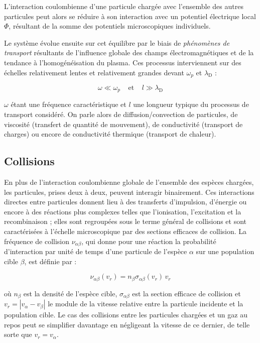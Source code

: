 \begin{refsection}
L'interaction coulombienne d'une particule chargée avec l'ensemble des autres particules peut alors
se réduire à son interaction avec un potentiel électrique local $\Phi$,
résultant de la somme des potentiels microscopiques individuels.

Le système évolue ensuite sur cet équilibre par le biais de
\emph{phénomènes de transport} résultants de l'influence
globale des champs électromagnétiques et de la tendance à
l'homogénéisation du plasma.
Ces processus interviennent sur des échelles relativement
lentes et relativement grandes devant $\omega_{p}$ et $\lambda_\text{D}$ :

\begin{equation}
\omega\ll \omega_{p}
\;\;\;\;\text{et}\;\;\;\;l\gg\lambda_\text{D}
\end{equation}

$\omega$ étant une fréquence caractéristique et $l$ une longueur typique
du processus de transport considéré.
On parle alors de diffusion/convection de particules, de viscosité (transfert de
quantité de mouvement), de conductivité (transport de charges) ou encore de
conductivité thermique (transport de chaleur).

\subsection{Collisions}
\label{1-Collisions}
En plus de l'interaction coulombienne globale de l'ensemble des espèces chargées, 
les particules, prises deux à deux, peuvent interagir binairement. 
Ces interactions directes entre particules donnent lieu à des transferts
d'impulsion, d'énergie ou encore à des réactions plus complexes telles que
l'ionisation, l'excitation et la recombinaison ; elles sont regroupées
sous le terme général de collisions et sont caractérisées à l'échelle
microscopique par des sections efficaces de collision. La fréquence de
collision $\nu_{\alpha \beta}$, qui donne pour une réaction la probabilité
d'interaction par unité de temps d'une particule de l'espèce $\alpha$ sur une
population cible $\beta$, est définie par :

\begin{equation}
\label{1-collisionfreq}
	\nu_{\alpha
	\beta}(v_r)=n_\beta\sigma_{\alpha
	\beta}(v_r)\,v_r
\end{equation}

où $n_\beta$ est la densité de l'espèce cible, $\sigma_{\alpha \beta}$ est la
section efficace de collision et $v_r=|v_\alpha-v_\beta|$ le module de
la vitesse relative entre la particule incidente et la population cible. 
Le cas des collisions entre les particules chargées et
un gaz au repos peut se simplifier davantage en négligeant la vitesse de ce
dernier, de telle sorte que $v_r=v_\alpha$. 


\end{refsection}
